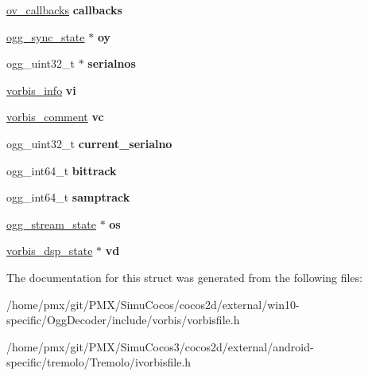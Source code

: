 \begin{DoxyCompactItemize}
\item 
\mbox{\label{structOggVorbis__File_afb1474e24193f577dd21395a76199415}} 
\hyperlink{structov__callbacks}{ov\+\_\+callbacks} {\bfseries callbacks}
\item 
\mbox{\label{structOggVorbis__File_a9129761105cdcb8064ab0f5bfe52ffca}} 
\hyperlink{structogg__sync__state}{ogg\+\_\+sync\+\_\+state} $\ast$ {\bfseries oy}
\item 
\mbox{\label{structOggVorbis__File_a5801bfa08956e1b6b02562d22862eba6}} 
ogg\+\_\+uint32\+\_\+t $\ast$ {\bfseries serialnos}
\item 
\mbox{\label{structOggVorbis__File_a13714f5b4fe1465840e35cf2f7e27a21}} 
\hyperlink{structvorbis__info}{vorbis\+\_\+info} {\bfseries vi}
\item 
\mbox{\label{structOggVorbis__File_a4d2494256e9fac758a9234cd65c9bfce}} 
\hyperlink{structvorbis__comment}{vorbis\+\_\+comment} {\bfseries vc}
\item 
\mbox{\label{structOggVorbis__File_a06b29b2f235f8c22df56f3e3109ea086}} 
ogg\+\_\+uint32\+\_\+t {\bfseries current\+\_\+serialno}
\item 
\mbox{\label{structOggVorbis__File_a5a1c6316698dea7add3447d89d65d3b8}} 
ogg\+\_\+int64\+\_\+t {\bfseries bittrack}
\item 
\mbox{\label{structOggVorbis__File_a4e3d37e484034c38ebab788126b3ab37}} 
ogg\+\_\+int64\+\_\+t {\bfseries samptrack}
\item 
\mbox{\label{structOggVorbis__File_ae8b78b6d3388bf99f04588fe2c801521}} 
\hyperlink{structogg__stream__state}{ogg\+\_\+stream\+\_\+state} $\ast$ {\bfseries os}
\item 
\mbox{\label{structOggVorbis__File_acd805e0293d5e4497a1a39eb7536e196}} 
\hyperlink{structvorbis__dsp__state}{vorbis\+\_\+dsp\+\_\+state} $\ast$ {\bfseries vd}
\end{DoxyCompactItemize}


The documentation for this struct was generated from the following files\+:\begin{DoxyCompactItemize}
\item 
/home/pmx/git/\+P\+M\+X/\+Simu\+Cocos/cocos2d/external/win10-\/specific/\+Ogg\+Decoder/include/vorbis/vorbisfile.\+h\item 
/home/pmx/git/\+P\+M\+X/\+Simu\+Cocos3/cocos2d/external/android-\/specific/tremolo/\+Tremolo/ivorbisfile.\+h\end{DoxyCompactItemize}
